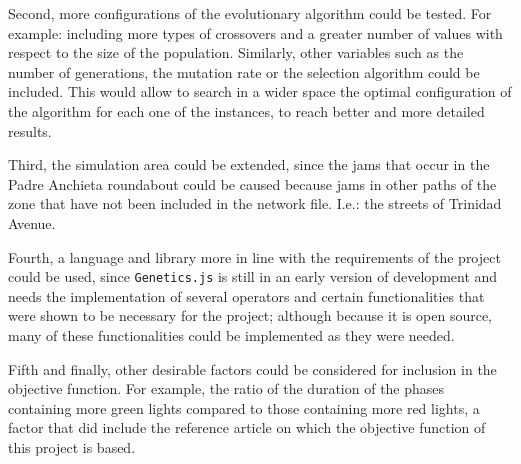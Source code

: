 Second, more configurations of the evolutionary algorithm could be tested. For example: including more types of crossovers and a greater number of values with respect to the size of the population. Similarly, other variables such as the number of generations, the mutation rate or the selection algorithm could be included. This would allow to search in a wider space the optimal configuration of the algorithm for each one of the instances, to reach better and more detailed results.

Third, the simulation area could be extended, since the jams that occur in the Padre Anchieta roundabout could be caused because jams in other paths of the zone that have not been included in the network file. I.e.: the streets of Trinidad Avenue.

Fourth, a language and library more in line with the requirements of the project could be used, since \texttt{Genetics.js} is still in an early version of development and needs the implementation of several operators and certain functionalities that were shown to be necessary for the project; although because it is open source, many of these functionalities could be implemented as they were needed.

Fifth and finally, other desirable factors could be considered for inclusion in the objective function. For example, the ratio of the duration of the phases containing more green lights compared to those containing more red lights, a factor that did include the reference article on which the objective function of this project is based.

